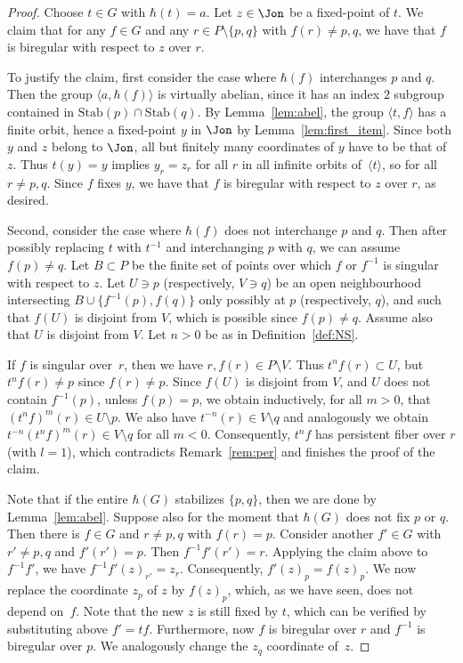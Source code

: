 \begin{proof}
Choose $t\in G$ with $\hbar(t)=a$. Let $z\in \Jon$ be a fixed-point of $t$. We claim that for any $f\in G$ and any $r\in P\setminus \{p,q\}$ with $f(r)\neq p,q$, we have that $f$ is biregular with respect to $z$ over $r$.

To justify the claim, first consider the case where $\hbar(f)$ interchanges $p$ and $q$. Then the group $\langle a, \hbar(f)\rangle$ is virtually abelian, {since it has an index $2$ subgroup contained in $\mathrm{Stab}(p)\cap\mathrm{Stab}(q)$}. By Lemma~\ref{lem:abel}, the group $\langle t,f\rangle$ has a finite orbit, hence a fixed-point $y$ in $\Jon$ by Lemma~\ref{lem:first_item}. {Since both $y$ and $z$ belong to $\Jon$}, all but finitely many coordinates of $y$ have to be that of $z$. {Thus} $t(y)=y$ implies $y_r=z_r$ for all $r$ in all infinite orbits of~$\langle t\rangle$, so for all $r\neq p,q$. Since $f$ fixes $y$, we have that $f$ is biregular with respect to $z$ over $r$, as desired.

Second, consider the case where $\hbar(f)$ does not interchange $p$ and $q$. Then after possibly replacing $t$ with $t^{-1}$ and interchanging $p$ with $q$, we can assume $f(p)\neq q$. Let $B\subset P$ be the finite set of points over which $f$ or $f^{-1}$ is singular with respect to $z$. Let $U\ni p$ (respectively, $V\ni q$) be an open neighbourhood intersecting $B\cup \{f^{-1}(p),f(q)\}$ only possibly at $p$ (respectively, $q$), and such that $f(U)$ is disjoint from $V$, which is possible since $f(p)\neq q$.
{Assume also that $U$ is disjoint from $V$.}
Let $n>0$ be as in Definition~\ref{def:NS}.

If $f$ is singular over~$r$, then we have $r,f(r)\in P\setminus V$. Thus $t^nf(r)\subset U$, but $t^nf(r)\neq p$ since $f(r)\neq p$.
Since $f(U)$ is disjoint from $V$, and $U$ does not contain $f^{-1}(p)$, unless $f(p)=p$, we obtain inductively, for all $m>0$, that $(t^nf)^m(r)\in U\setminus p$. We also have $t^{-n}(r)\in V\setminus q$ and analogously we obtain $t^{-n}(t^nf)^m(r)\in V\setminus q$ for all $m<0$. Consequently, $t^nf$ has persistent fiber over $r$ (with $l=1$), which contradicts Remark~\ref{rem:per} and finishes the proof of the claim.

Note that if the entire $\hbar(G)$ stabilizes $\{p,q\}$, then we are done by Lemma~\ref{lem:abel}. Suppose also for the moment that $\hbar(G)$ does not {fix} $p$ or $q$. Then there is $f\in G$ and $r\neq p,q$ with $f(r)=p$. Consider another $f'\in G$ with $r'\neq p,q$ and $f'(r')=p$. Then $f^{-1}f'(r')=r$. Applying the claim above to $f^{-1}f'$, we have $f^{-1}f'(z)_{r'}= z_{r}$. Consequently, $f'(z)_{p}= f(z)_{p}$. We now replace the coordinate $z_p$ of $z$ by $f(z)_{p}$, which, as we have seen, does not depend on~$f$. Note that the new $z$ is still fixed by $t$, which can be verified by substituting above $f'=tf$. Furthermore, now $f$ is biregular over $r$ and $f^{-1}$ is biregular over $p$.
We analogously change the $z_q$ coordinate of~$z$.


\end{proof}
